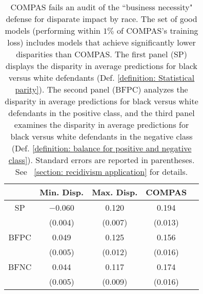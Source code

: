 \documentclass{article}
\begin{document}
\begin{table}[t]
\caption{COMPAS fails an audit of the ``business necessity" defense for disparate impact by race. The set of good models (performing within $1\%$ of COMPAS's training loss) includes models that achieve significantly lower disparities than COMPAS.  The first panel (SP) displays the disparity in average predictions for black versus white defendants (Def. \ref{definition: Statistical parity}). The second panel (BFPC) analyzes the disparity in average predictions for black versus white defendants in the positive class, and the third panel examines the disparity in average predictions for black versus white defendants in the negative class (Def. \ref{definition: balance for positive and negative class}). Standard errors are reported in parentheses. See \textsection~\ref{section: recidivism application} for details.}
\label{table: Compas Race - ref model compas Test}
\vskip 0.05in
\begin{center}
\begin{small}
\begin{sc}
\begin{tabular}{ccccr}
\toprule
& Min. Disp. & Max. Disp.  & COMPAS \\
\midrule
SP & $-$0.060 & 0.120 & 0.194 \\
& (0.004) & (0.007) & (0.013) \\
\midrule 
BFPC & 0.049 & 0.125 & 0.156 \\
& (0.005) & (0.012) & (0.016) \\
\midrule
BFNC & 0.044 & 0.117 & 0.174 \\
& (0.005) & (0.009) & (0.016) \\
\bottomrule
\end{tabular}
\end{sc}
\end{small}
\end{center}
\vskip -0.1in
\end{table}
\end{document}
